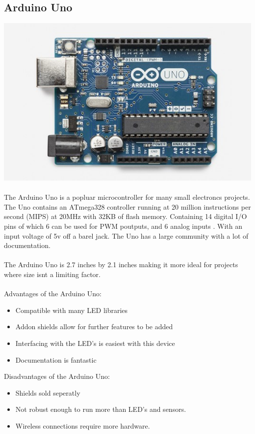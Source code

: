 \documentclass[onecolumn, draftclsnofoot,10pt, compsoc]{IEEEtran}
\begin{document}
		\subsection{Arduino Uno}
		\includegraphics[scale=0.3]{ard.jpg}
		\\\\
		The Arduino Uno is a popluar microcontroller for many small electroncs
		projects. The Uno contains an ATmega328 controller running at 20 million
		instructions per second (MIPS) at 20MHz with 32KB of flash
		memory\cite[Pg 2]{atmel}. Containing 14 digital I/O pins of which 6
		can be used for PWM poutputs, and 6 analog inputs \cite[Pg 2]{arduino}. With
		an input voltage of 5v off a barel jack. The Uno has a large community with
		a lot of documentation.
		\\\\
		The Arduino Uno is 2.7 inches by 2.1 inches making it more ideal for
		projects where size isnt a limiting factor.
		\\\\Advantages of the Arduino Uno:
		\begin{itemize}
			\item Compatible with many LED libraries
			\item Addon shields allow for further features to be added
			\item Interfacing with the LED's is easiest with this device
			\item Documentation is fantastic
		\end{itemize}
		Disadvantages of the Arduino Uno:
		\begin{itemize}
			\item Shields sold seperatly
			\item Not robust enough to run more than LED's and sensors.
			\item Wireless connections require more hardware.
		\end{itemize}
\end{document}
